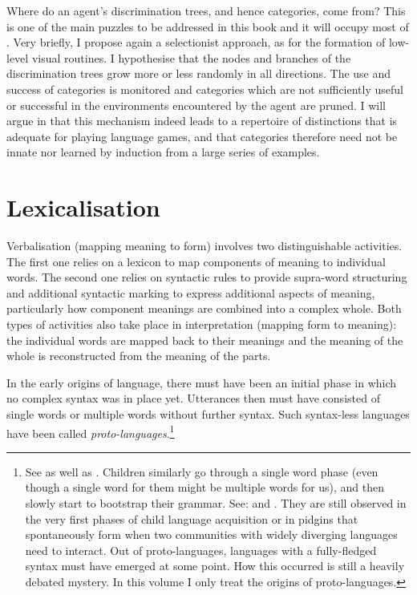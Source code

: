 Where do an agent's discrimination trees, and hence
categories, come from? This is one of the main 
puzzles to be addressed in this book and it will 
occupy most of . Very briefly, 
I propose again a selectionist approach, as for
the formation of low-level visual routines. I hypothesise
that the nodes and branches of the discrimination trees
grow more or less randomly in all directions. The use and
success of categories is monitored and categories which 
are not sufficiently useful or successful in the environments
encountered by the agent are pruned. I will argue in 
that this mechanism indeed leads to 
a repertoire of distinctions that is adequate for 
playing language games, and that 
categories therefore need not be innate nor learned by 
induction from a large series of examples. 

\section{Lexicalisation}

Verbalisation (mapping meaning to form) 
involves two distinguishable activities.  The first one
relies on a lexicon to map components of meaning to
individual words. The second 
one relies on syntactic rules to provide supra-word structuring 
and additional syntactic marking to express additional
aspects of meaning, particularly how component meanings
are combined into a complex whole. Both types of 
activities also take place in interpretation (mapping form to meaning):
the individual words are mapped back to their meanings
and the meaning of the whole is reconstructed from the 
meaning of the parts. 

In the early origins of language,
there must have been an initial phase in which no complex syntax 
was in place yet. Utterances then must have consisted of single words
or multiple words without further syntax. 
Such syntax-less languages have been called {\itshape proto-languages}.\footnote{
See \cite{Bickerton:1990} as well as \cite{Thomason:1988}. Children similarly 
go through a single word phase (even though a single 
word for them might be multiple words for us), and 
then slowly start to bootstrap their grammar. 
See: \cite{Tomasello:1991} and \cite{Bates:1991}. 
They are still observed in the very first phases of 
child language acquisition or in pidgins that spontaneously 
form when two communities with widely diverging languages
need to interact. Out of proto-languages, languages 
with a fully-fledged syntax must have emerged at some point. 
How this occurred is still a heavily debated mystery. In this volume 
I only treat the origins of proto-languages.} 

